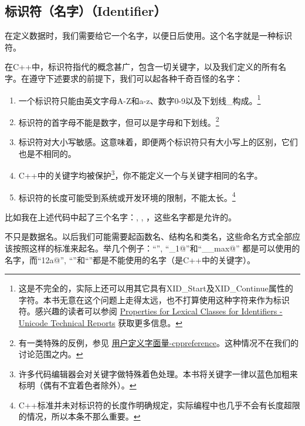 \subsection*{标识符（名字）（Identifier）}
在定义数据时，我们需要给它一个名字，以便日后使用。这个名字就是一种标识符。\par
在C++中，标识符指代的概念甚广，包含一切关键字，以及我们定义的所有名字。在遵守下述要求的前提下，我们可以起各种千奇百怪的名字：
\begin{enumerate}
    \item 一个标识符只能由英文字母A-Z和a-z、数字0-9以及下划线\_构成。\footnote{这是不完全的，实际上还可以用其它具有XID\_Start及XID\_Continue属性的字符。本书无意在这个问题上走得太远，也不打算使用这种字符来作为标识符。感兴趣的读者可以参阅 \href{https://www.unicode.org/reports/tr31/\#Table\_Lexical\_Classes\_for\_Identifiers}{Properties for Lexical Classes for Identifiers - Unicode Technical Reports} 获取更多信息。}
    \item 标识符的首字母不能是数字，但可以是字母和下划线。\footnote{有一类特殊的反例，参见 \href{https://zh.cppreference.com/w/cpp/language/user_literal}{用户定义字面量-cppreference}。这种情况不在我们的讨论范围之内。}
    \item 标识符对大小写敏感。这意味着，即便两个标识符只有大小写上的区别，它们也是不相同的。
    \item C++中的关键字均被保护\footnote{许多代码编辑器会对关键字做特殊着色处理。本书将关键字一律以蓝色加粗来标明（偶有不宜着色者除外）。}，你不能定义一个与关键字相同的名字。
    \item 标识符的长度可能受到系统或开发环境的限制，不能太长。\footnote{C++标准并未对标识符的长度作明确规定，实际编程中也几乎不会有长度超限的情况，所以本条不那么重要。}
\end{enumerate}
比如我在上述代码中起了三个名字：\lstinline@i@, \lstinline@d@, \lstinline@c@，这些名字都是允许的。\par
不只是数据名。以后我们可能需要起函数名、结构名和类名，这些命名方式全部应该按照这样的标准来起名。举几个例子：``\lstinline@lhs@'', ``\lstinline@it_1@''和``\lstinline@__max@'' 都是可以使用的名字，而``\lstinline@12a@'', ``''和``\lstinline@new@''都是不能使用的名字（\lstinline@new@ 是C++中的关键字）。\par
